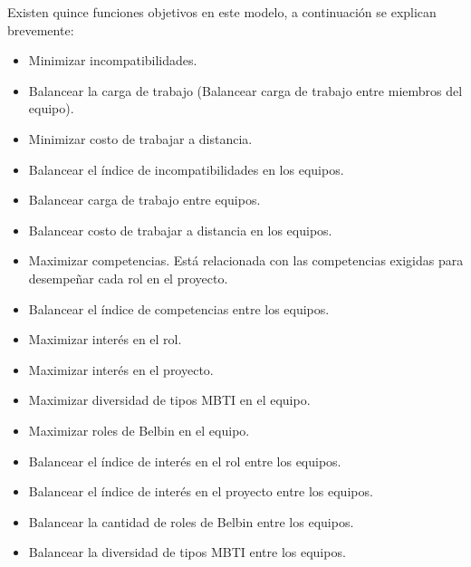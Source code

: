Existen quince funciones objetivos en este modelo, a continuación se explican brevemente:
\begin{itemize}
	\item Minimizar incompatibilidades.
	\item Balancear la carga de trabajo (Balancear carga de trabajo entre miembros del equipo).
	\item Minimizar costo de trabajar a distancia.
	\item Balancear el índice de incompatibilidades en los equipos.
	\item Balancear carga de trabajo entre equipos.
	\item Balancear costo de trabajar a distancia en los equipos.
	\item Maximizar competencias. Está relacionada con las competencias exigidas para desempeñar cada rol en el proyecto.
	\item Balancear el índice de competencias entre los equipos.
	\item Maximizar interés en el rol.
	\item Maximizar interés en el proyecto.
	\item Maximizar diversidad de tipos MBTI en el equipo.
	\item Maximizar roles de Belbin en el equipo.
	\item Balancear el índice de interés en el rol entre los equipos.
	\item Balancear el índice de interés en el proyecto entre los equipos.
	\item Balancear la cantidad de roles de Belbin entre los equipos.
	\item Balancear la diversidad de tipos MBTI entre los equipos.
\end{itemize}

